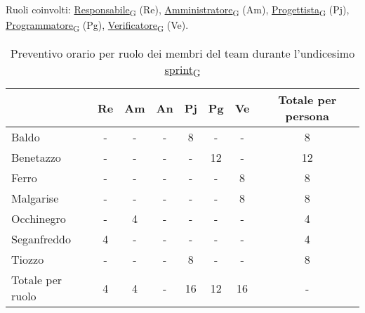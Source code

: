 \newpage
{}
Ruoli coinvolti: \href{https://7last.github.io/docs/rtb/documentazione-interna/glossario\#responsabile}{Responsabile\textsubscript{G}} (Re), \href{https://7last.github.io/docs/rtb/documentazione-interna/glossario\#amministratore}{Amministratore\textsubscript{G}} (Am), \href{https://7last.github.io/docs/rtb/documentazione-interna/glossario\#progettista}{Progettista\textsubscript{G}} (Pj), \href{https://7last.github.io/docs/rtb/documentazione-interna/glossario\#programmatore}{Programmatore\textsubscript{G}} (Pg), \href{https://7last.github.io/docs/rtb/documentazione-interna/glossario\#verificatore}{Verificatore\textsubscript{G}} (Ve).
\begin{table}[!h]
    \centering
    \begin{tabular}{ | l | c | c | c | c | c | c | c | }
        \hline
        \textbf{} & \textbf{Re} & \textbf{Am} &\textbf{An} & \textbf{Pj} & \textbf{Pg} & \textbf{Ve} & \textbf{Totale per persona} \\
        \hline
        Baldo            &  -   &  -   &  -   &  8   &  -   &  -   &  8   \\
        Benetazzo        &  -   &  -   &  -   &  -   & 12   &  -   & 12   \\
        Ferro            &  -   &  -   &  -   &  -   &  -   &  8   &  8   \\
        Malgarise        &  -   &  -   &  -   &  -   &  -   &  8   &  8   \\
        Occhinegro       &  -   &  4   &  -   &  -   &  -   &  -   &  4   \\
        Seganfreddo      &  4   &  -   &  -   &  -   &  -   &  -   &  4   \\
        Tiozzo           &  -   &  -   &  -   &  8   &  -   &  -   &  8   \\
        \hline
        Totale per ruolo &  4   &  4   &  -   & 16   & 12   & 16   &  -   \\
        \hline
    \end{tabular}
    \caption{Preventivo orario per ruolo dei membri del team durante l'undicesimo \href{https://7last.github.io/docs/rtb/documentazione-interna/glossario\#sprint}{sprint\textsubscript{G}}}
    
\end{table}

